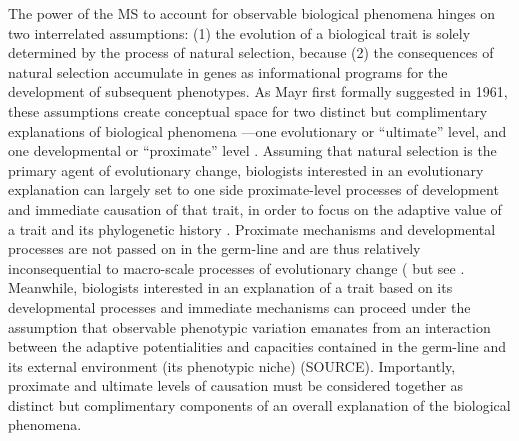 The power of the MS to account for observable biological phenomena hinges on two interrelated assumptions: (1) the evolution of a biological trait is solely determined by the process of natural selection, because (2) the consequences of natural selection accumulate in genes as informational programs for the development of subsequent phenotypes.  As Mayr first formally suggested in 1961, these assumptions create conceptual space for two distinct but complimentary explanations of biological phenomena ---one evolutionary or ``ultimate'' level, and one developmental or ``proximate'' level \citep{Mayr1961}.  Assuming that natural selection is the primary agent of evolutionary change, biologists interested in an evolutionary explanation can largely set to one side proximate-level processes of development and immediate causation of that trait, in order to focus on the adaptive value of a trait and its phylogenetic history \citep{Mayr1961,Tinbergen1963}.  Proximate mechanisms and developmental processes are not passed on in the germ-line and are thus relatively inconsequential to macro-scale processes of evolutionary change (\citep{Dawkins1982,Grafen1991,Svensson2017} but see \citep{Laland2012,Laland2015}.  Meanwhile, biologists interested in an explanation of a trait based on its developmental processes and immediate mechanisms can proceed under the assumption that observable phenotypic variation emanates from an interaction between the adaptive potentialities and capacities contained in the germ-line and its external environment (its phenotypic niche) (SOURCE).  Importantly, proximate and ultimate levels of causation must be considered together as distinct but complimentary components of an overall explanation of the biological phenomena\citep{Mayr1961,Tinbergen1963}.
%

